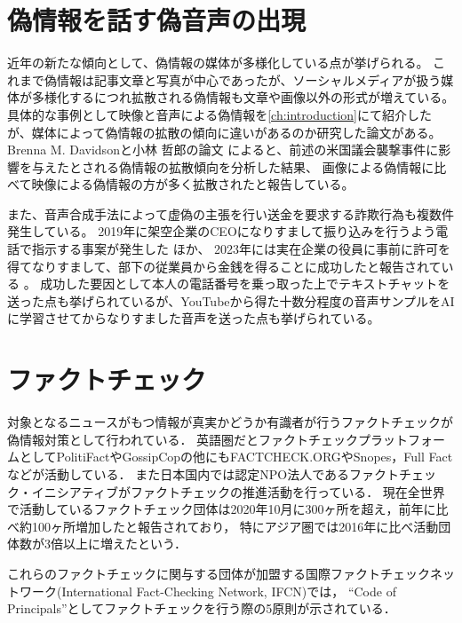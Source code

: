 \section{偽情報を話す偽音声の出現}
近年の新たな傾向として、偽情報の媒体が多様化している点が挙げられる。
これまで偽情報は記事文章と写真が中心であったが、ソーシャルメディアが扱う媒体が多様化するにつれ拡散される偽情報も文章や画像以外の形式が増えている。
具体的な事例として映像と音声による偽情報を\cref{ch:introduction}にて紹介したが、媒体によって偽情報の拡散の傾向に違いがあるのか研究した論文がある。
Brenna M. Davidsonと小林 哲郎の論文 \cite{DAVIDSON2022107241}によると、前述の米国議会襲撃事件に影響を与えたとされる偽情報の拡散傾向を分析した結果、
画像による偽情報に比べて映像による偽情報の方が多く拡散されたと報告している。

また、音声合成手法によって虚偽の主張を行い送金を要求する詐欺行為も複数件発生している。
2019年に架空企業のCEOになりすまして振り込みを行うよう電話で指示する事案が発生した \cite{Stupp_2019}ほか、
2023年には実在企業の役員に事前に許可を得てなりすまして、部下の従業員から金銭を得ることに成功したと報告されている \cite{Bunn_2023}。
成功した要因として本人の電話番号を乗っ取った上でテキストチャットを送った点も挙げられているが、YouTubeから得た十数分程度の音声サンプルをAIに学習させてからなりすました音声を送った点も挙げられている。


\section{ファクトチェック}
対象となるニュースがもつ情報が真実かどうか有識者が行うファクトチェックが偽情報対策として行われている．
英語圏だとファクトチェックプラットフォームとしてPolitiFactやGossipCopの他にもFACTCHECK.ORGやSnopes，Full Factなどが活動している．
また日本国内では認定NPO法人であるファクトチェック・イニシアティブがファクトチェックの推進活動を行っている．
現在全世界で活動しているファクトチェック団体は2020年10月に300ヶ所を超え，前年に比べ約100ヶ所増加したと報告されており，
特にアジア圏では2016年に比べ活動団体数が3倍以上に増えたという\cite{stencel_luther_2020}．

これらのファクトチェックに関与する団体が加盟する国際ファクトチェックネットワーク(International Fact-Checking Network, IFCN)では，
``Code of Principals''としてファクトチェックを行う際の5原則が示されている\cite{IFCN,fij}．

